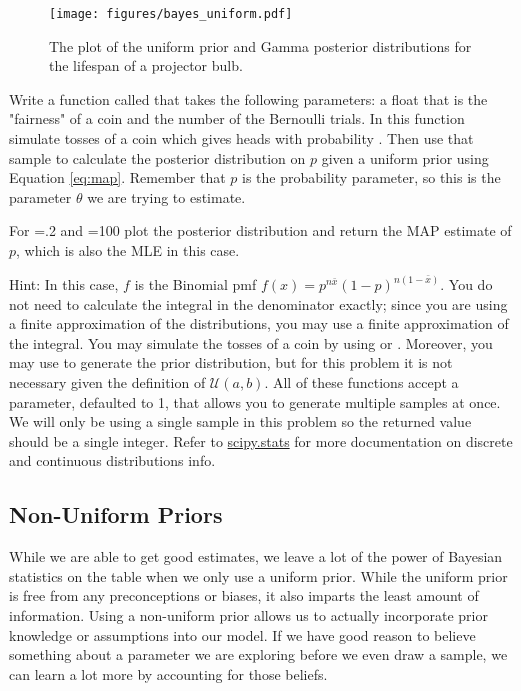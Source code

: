 \begin{figure}[H]
    \centering
    \texttt{[image: figures/bayes\_uniform.pdf]}
    \caption{The plot of the uniform prior and Gamma posterior distributions for the lifespan of a projector bulb.}
\end{figure}

\begin{problem}\label{prob:unif}
  Write a function called  that takes the following parameters:  a float that is the "fairness" of a coin and  the number of the Bernoulli trials.
  In this function simulate  tosses of a coin which gives heads with probability .
  Then use that sample to calculate the posterior distribution on $p$ given a uniform prior using Equation \ref{eq:map}.
  Remember that $p$ is the probability parameter, so this is the parameter $\theta$ we are trying to estimate.

  For =.2 and =100 plot the posterior distribution and return the MAP estimate of $p$, which is also the MLE in this case.

  Hint: In this case, $f$ is the Binomial pmf $f(x) = p^{n\bar{x}}(1-p)^{n(1-\bar{x})}$.
  You do not need to calculate the integral in the denominator exactly; since you are using a finite approximation of the distributions, you may use a finite approximation of the integral.
  You may simulate the tosses of a coin by using  or .
  Moreover, you may use  to generate the prior distribution, but for this problem it is not necessary given the definition of $\mathcal{U}(a,b)$.
  All of these functions accept a  parameter, defaulted to 1, that allows you to generate multiple samples at once.
  We will only be using a single sample in this problem so the returned value should be a single integer.
  Refer to \href{https://docs.scipy.org/doc/scipy/tutorial/stats.html}{scipy.stats} for more documentation on discrete and continuous distributions info.
\end{problem}

\subsection*{Non-Uniform Priors}
While we are able to get good estimates, we leave a lot of the power of Bayesian statistics on the table when we only use a uniform prior.
While the uniform prior is free from any preconceptions or biases, it also imparts the least amount of information.
Using a non-uniform prior allows us to actually incorporate prior knowledge or assumptions into our model.
If we have good reason to believe something about a parameter we are exploring before we even draw a sample, we can learn a lot more by accounting for those beliefs.

